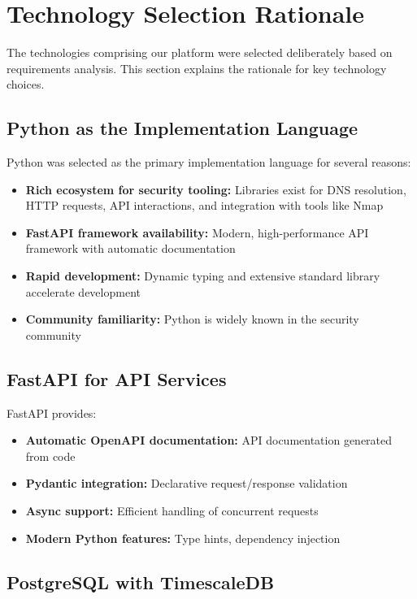 \documentclass[a4paper,12pt]{report}
\begin{document}
\section{Technology Selection Rationale}

The technologies comprising our platform were selected deliberately based on requirements analysis. This section explains the rationale for key technology choices.

\subsection{Python as the Implementation Language}

Python was selected as the primary implementation language for several reasons:\hfill

\begin{itemize}
\item \textbf{Rich ecosystem for security tooling:} Libraries exist for DNS resolution, HTTP requests, API interactions, and integration with tools like Nmap \cite{nmap_docs}
\item \textbf{FastAPI \cite{fastapi_docs} framework availability:} Modern, high-performance API framework with automatic documentation
\item \textbf{Rapid development:} Dynamic typing and extensive standard library accelerate development
\item \textbf{Community familiarity:} Python is widely known in the security community
\end{itemize}

\subsection{FastAPI for API Services}

FastAPI provides: \hfill

\begin{itemize}
\item \textbf{Automatic OpenAPI documentation:} API documentation generated from code
\item \textbf{Pydantic \cite{pydantic_docs} integration:} Declarative request/response validation
\item \textbf{Async support:} Efficient handling of concurrent requests
\item \textbf{Modern Python features:} Type hints, dependency injection
\end{itemize}

\subsection{PostgreSQL with TimescaleDB}
\end{document}
